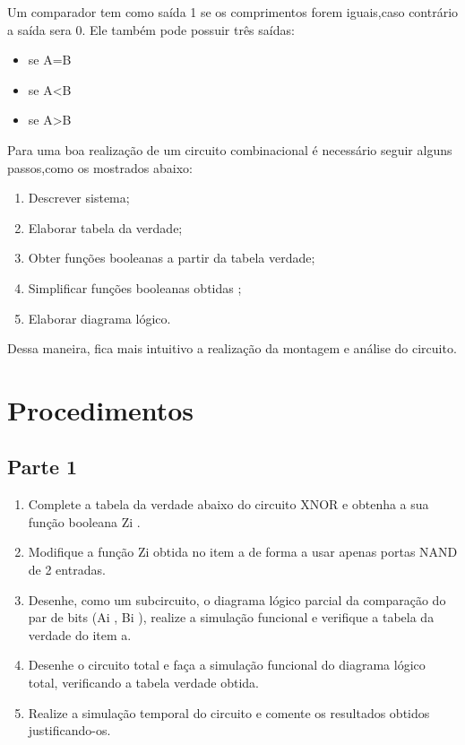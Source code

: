 \documentclass[12pt]{article}
\begin{document}
Um comparador tem como saída 1 se os comprimentos forem iguais,caso
contrário a saída sera 0.
Ele também pode possuir três saídas:

\begin{itemize}
	\item	se A=B
	\item	se A\textless B
	\item	se A\textgreater B
\end{itemize}

Para uma boa realização de um circuito combinacional é necessário seguir alguns
passos,como os mostrados abaixo:

\begin{enumerate}[label=(\alph*)]
	\item	Descrever sistema;
	\item 	Elaborar tabela da verdade;
	\item	Obter funções booleanas a partir da tabela verdade;
	\item	Simplificar funções booleanas obtidas ;
	\item	Elaborar diagrama lógico.
\end{enumerate}
Dessa maneira, fica mais intuitivo a realização da montagem e análise do circuito.

\section{Procedimentos}
\label{sec:Procedimentos}
\subsection{Parte 1}
\begin{enumerate}[label=(\roman*)]
	\item Complete a tabela da verdade abaixo do circuito XNOR e obtenha a sua função booleana Zi .
	\item Modifique a função Zi obtida no item a de forma a usar apenas portas NAND de 2 entradas.
	\item Desenhe, como um subcircuito, o diagrama lógico parcial da comparação do par de bits (Ai ,
	Bi ), realize a simulação funcional e verifique a tabela da verdade do item a.
	\item Desenhe o circuito total e faça a simulação funcional do diagrama lógico total, verificando a
	tabela verdade obtida.
	\item Realize a simulação temporal do circuito e comente os resultados obtidos justificando-os.
\end{enumerate}
\end{document}

